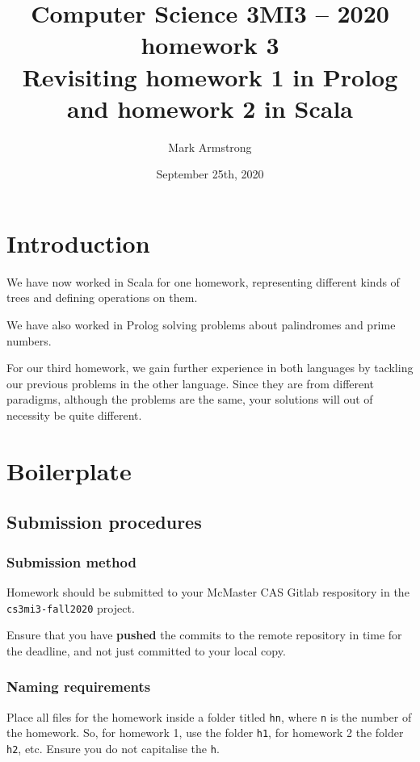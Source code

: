 \documentclass[11pt]{article}
\author{Mark Armstrong}
\date{September 25th, 2020}
\title{Computer Science 3MI3 – 2020 homework 3\\\medskip
\large Revisiting homework 1 in Prolog and homework 2 in Scala}
\begin{document}
\maketitle
\tableofcontents


\section*{Introduction}
\label{sec:org561baed}
We have now worked in Scala for one homework,
representing different kinds of trees
and defining operations on them.

We have also worked in Prolog solving problems
about palindromes and prime numbers.

For our third homework, we gain further experience
in both languages by tackling our previous problems
in the other language.
Since they are from different paradigms,
although the problems are the same,
your solutions will out of necessity be quite different.

\section*{Boilerplate}
\label{sec:orgd4bc16b}
\subsection*{Submission procedures}
\label{sec:org172795c}
\subsubsection*{Submission method}
\label{sec:org699a4e4}

Homework should be submitted to your McMaster CAS Gitlab respository
in the \texttt{cs3mi3-fall2020} project.

Ensure that you have \textbf{pushed} the commits to the remote repository
in time for the deadline, and not just committed to your local copy.

\subsubsection*{Naming requirements}
\label{sec:org7099cc3}

Place all files for the homework
inside a folder titled \texttt{hn}, where \texttt{n} is the number of the homework.
So, for homework 1, use the folder \texttt{h1}, for homework 2 the folder \texttt{h2}, etc.
Ensure you do not capitalise the \texttt{h}.
\end{document}
